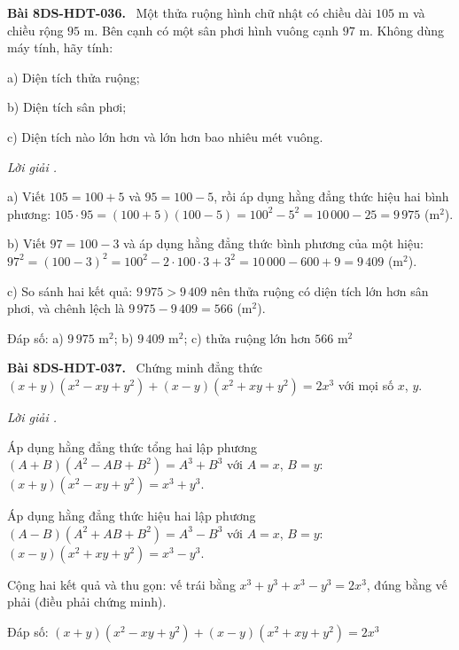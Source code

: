 \documentclass[12pt,a4paper]{article}
\newenvironment{problem}[1][]{\par\medskip\noindent\textbf{Bài #1.}\ }{\par}
\newenvironment{solution}[1][]{\par\noindent\textit{Lời giải #1.}\par}{\par}
\begin{document}
\begin{problem}[8DS-HDT-036]
Một thửa ruộng hình chữ nhật có chiều dài $105$ m và chiều rộng $95$ m. Bên cạnh có một sân phơi hình vuông cạnh $97$ m. Không dùng máy tính, hãy tính:

a) Diện tích thửa ruộng;

b) Diện tích sân phơi;

c) Diện tích nào lớn hơn và lớn hơn bao nhiêu mét vuông.

\begin{solution}
a) Viết $105 = 100 + 5$ và $95 = 100 - 5$, rồi áp dụng hằng đẳng thức hiệu hai bình phương: $105 \cdot 95 = (100 + 5)(100 - 5) = 100^2 - 5^2 = 10\,000 - 25 = 9\,975$ (m$^2$).

b) Viết $97 = 100 - 3$ và áp dụng hằng đẳng thức bình phương của một hiệu: $97^2 = (100 - 3)^2 = 100^2 - 2 \cdot 100 \cdot 3 + 3^2 = 10\,000 - 600 + 9 = 9\,409$ (m$^2$).

c) So sánh hai kết quả: $9\,975 > 9\,409$ nên thửa ruộng có diện tích lớn hơn sân phơi, và chênh lệch là $9\,975 - 9\,409 = 566$ (m$^2$).

Đáp số: a) $\boxed{9\,975 \text{ m}^2}$; b) $\boxed{9\,409 \text{ m}^2}$; c) $\boxed{\text{thửa ruộng lớn hơn } 566 \text{ m}^2}$
\end{solution}
\end{problem}

\begin{problem}[8DS-HDT-037]
Chứng minh đẳng thức $(x + y)(x^2 - xy + y^2) + (x - y)(x^2 + xy + y^2) = 2x^3$ với mọi số $x$, $y$.

\begin{solution}
Áp dụng hằng đẳng thức tổng hai lập phương $(A + B)(A^2 - AB + B^2) = A^3 + B^3$ với $A = x$, $B = y$: $(x + y)(x^2 - xy + y^2) = x^3 + y^3$.

Áp dụng hằng đẳng thức hiệu hai lập phương $(A - B)(A^2 + AB + B^2) = A^3 - B^3$ với $A = x$, $B = y$: $(x - y)(x^2 + xy + y^2) = x^3 - y^3$.

Cộng hai kết quả và thu gọn: vế trái bằng $x^3 + y^3 + x^3 - y^3 = 2x^3$, đúng bằng vế phải (điều phải chứng minh).

Đáp số: $\boxed{(x + y)(x^2 - xy + y^2) + (x - y)(x^2 + xy + y^2) = 2x^3}$
\end{solution}
\end{problem}
\end{document}
